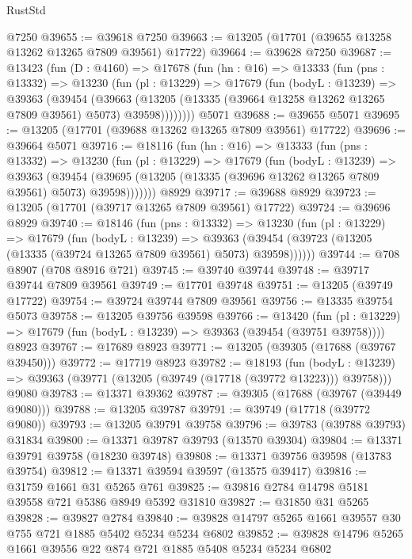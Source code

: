 \begin{lexlean}{RustStd}
\begin{coremodule}
    @7250
@39655 := @39618 @7250
@39663 := @13205 (@17701 (@39655 @13258 @13262 @13265 @7809 @39561) @17722)
@39664 := @39628 @7250
@39687 := @13423
    (fun (D : @4160) =>
    @17678
      (fun (hn : @16) =>
      @13333
        (fun (pns : @13332) =>
        @13230
          (fun (pl : @13229) =>
          @17679
            (fun (bodyL : @13239) =>
            @39363
              (@39454
                (@39663
                  (@13205 (@13335 (@39664 @13258 @13262 @13265 @7809 @39561) @5073) @39598))))))))
    @5071
@39688 := @39655 @5071
@39695 := @13205 (@17701 (@39688 @13262 @13265 @7809 @39561) @17722)
@39696 := @39664 @5071
@39716 := @18116
    (fun (hn : @16) =>
    @13333
      (fun (pns : @13332) =>
      @13230
        (fun (pl : @13229) =>
        @17679
          (fun (bodyL : @13239) =>
          @39363
            (@39454 (@39695 (@13205 (@13335 (@39696 @13262 @13265 @7809 @39561) @5073) @39598)))))))
    @8929
@39717 := @39688 @8929
@39723 := @13205 (@17701 (@39717 @13265 @7809 @39561) @17722)
@39724 := @39696 @8929
@39740 := @18146
    (fun (pns : @13332) =>
    @13230
      (fun (pl : @13229) =>
      @17679
        (fun (bodyL : @13239) =>
        @39363 (@39454 (@39723 (@13205 (@13335 (@39724 @13265 @7809 @39561) @5073) @39598))))))
@39744 := @708 @8907 (@708 @8916 @721)
@39745 := @39740 @39744
@39748 := @39717 @39744 @7809 @39561
@39749 := @17701 @39748
@39751 := @13205 (@39749 @17722)
@39754 := @39724 @39744 @7809 @39561
@39756 := @13335 @39754 @5073
@39758 := @13205 @39756 @39598
@39766 := @13420
    (fun (pl : @13229) => @17679 (fun (bodyL : @13239) => @39363 (@39454 (@39751 @39758))))
    @8923
@39767 := @17689 @8923
@39771 := @13205 (@39305 (@17688 (@39767 @39450)))
@39772 := @17719 @8923
@39782 := @18193
    (fun (bodyL : @13239) => @39363 (@39771 (@13205 (@39749 (@17718 (@39772 @13223))) @39758)))
    @9080
@39783 := @13371 @39362
@39787 := @39305 (@17688 (@39767 (@39449 @9080)))
@39788 := @13205 @39787
@39791 := @39749 (@17718 (@39772 @9080))
@39793 := @13205 @39791 @39758
@39796 := @39783 (@39788 @39793) @31834
@39800 := @13371 @39787 @39793 (@13570 @39304)
@39804 := @13371 @39791 @39758 (@18230 @39748)
@39808 := @13371 @39756 @39598 (@13783 @39754)
@39812 := @13371 @39594 @39597 (@13575 @39417)
@39816 := @31759 @1661 @31 @5265 @761
@39825 := @39816 @2784 @14798 @5181 @39558 @721 @5386 @8949 @5392 @31810
@39827 := @31850 @31 @5265
@39828 := @39827 @2784
@39840 := @39828 @14797 @5265 @1661 @39557 @30 @755 @721 @1885 @5402 @5234 @5234 @6802
@39852 := @39828 @14796 @5265 @1661 @39556 @22 @874 @721 @1885 @5408 @5234 @5234 @6802

\end{coremodule}
\end{lexlean}
